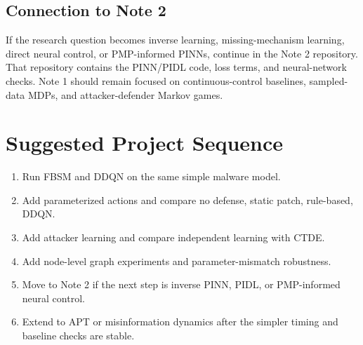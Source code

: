 \documentclass[11pt,a4paper]{article}
\begin{document}
\subsection{Connection to Note 2}
If the research question becomes inverse learning, missing-mechanism learning, direct neural control, or PMP-informed PINNs, continue in the Note 2 repository. That repository contains the PINN/PIDL code, loss terms, and neural-network checks. Note 1 should remain focused on continuous-control baselines, sampled-data MDPs, and attacker-defender Markov games.

\section{Suggested Project Sequence}
\begin{enumerate}
\item Run FBSM and DDQN on the same simple malware model.
\item Add parameterized actions and compare no defense, static patch, rule-based, DDQN.
\item Add attacker learning and compare independent learning with CTDE.
\item Add node-level graph experiments and parameter-mismatch robustness.
\item Move to Note 2 if the next step is inverse PINN, PIDL, or PMP-informed neural control.
\item Extend to APT or misinformation dynamics after the simpler timing and baseline checks are stable.
\end{enumerate}
\end{document}
